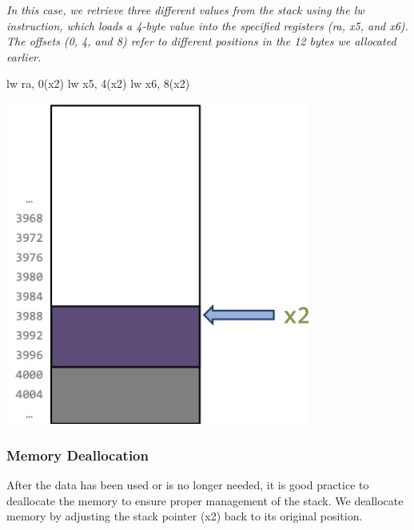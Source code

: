 \begin{minipage}[htp]{0.4\textwidth}
\textit{In this case, we retrieve three different values from the stack using the lw instruction, which loads a 4-byte value into the specified registers (ra, x5, and x6). The offsets (0, 4, and 8) refer to different positions in the 12 bytes we allocated earlier.}
\begin{assembly}
lw ra, 0(x2)
lw x5, 4(x2)
lw x6, 8(x2)
\end{assembly}
\end{minipage}
\hfill
\vline
\hfill
\begin{minipage}[htp]{0.4\textwidth}
\begin{center}
\includegraphics[width=0.75\textwidth]{chapters/chapter1b/images/stack3.png}
\end{center}
\end{minipage}

\subsubsection{Memory Deallocation}
After the data has been used or is no longer needed, it is good practice to deallocate the memory to ensure proper management of the stack. We deallocate memory by adjusting the stack pointer (x2) back to its original position.


